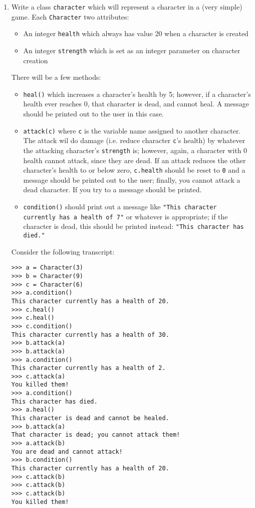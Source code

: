 \documentclass{article}
\begin{document}
\begin{enumerate}
\begin{verbatim}
\end{verbatim}

\item Write a class \verb|character| which will represent a character in a (very simple) game. Each \verb|Character| two attributes:

\begin{itemize}
  \item An integer \verb|health| which always has value 20 when a character is created
  \item An integer \verb|strength| which is set as an integer parameter on character creation
\end{itemize}

There will be a few methods:

\begin{itemize}
  \item \verb|heal()| which increases a character's health by 5; however, if a character's health ever reaches 0, that character is dead, and cannot heal. A message should be printed out to the user in this case.
  \item \verb|attack(c)| where \verb|c| is the variable name assigned to another character. The attack wil do damage (i.e. reduce character \verb|c|'s health) by whatever the attacking character's \verb|strength| is; however, again, a character with 0 health cannot attack, since they are dead. If an attack reduces the other character's health to or below zero, \verb|c.health| should be reset to \verb|0| and a message should be printed out to the user; finally, you cannot attack a dead character. If you try to a message should be printed.
  \item \verb|condition()| should print out a message like \verb|"This character currently has a health of 7"| or whatever is appropriate; if the character is dead, this should be printed instead: \verb|"This character has died."|
\end{itemize}

Consider the following transcript:

\begin{verbatim}
>>> a = Character(3)
>>> b = Character(9)
>>> c = Character(6)
>>> a.condition()
This character currently has a health of 20.
>>> c.heal()
>>> c.heal()
>>> c.condition()
This character currently has a health of 30.
>>> b.attack(a)
>>> b.attack(a)
>>> a.condition()
This character currently has a health of 2.
>>> c.attack(a)
You killed them!
>>> a.condition()
This character has died.
>>> a.heal()
This character is dead and cannot be healed.
>>> b.attack(a)
That character is dead; you cannot attack them!
>>> a.attack(b)
You are dead and cannot attack!
>>> b.condition()
This character currently has a health of 20.
>>> c.attack(b)
>>> c.attack(b)
>>> c.attack(b)
You killed them!

\end{verbatim}






\end{enumerate}
\end{document}
